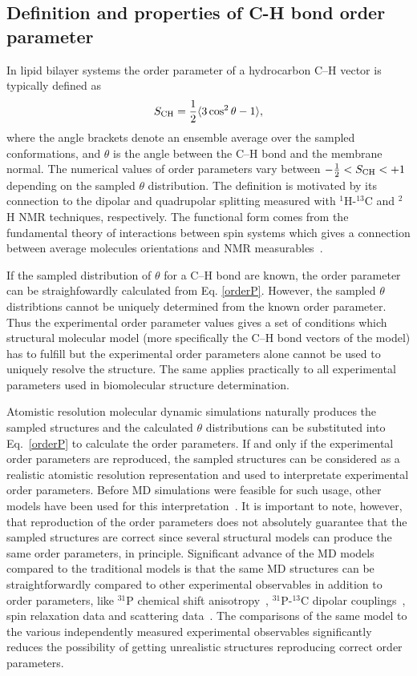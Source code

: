 \documentclass[aps,prl,superscriptaddress,twocolumn]{revtex4}
\begin{document}
\subsection{Definition and properties of C-H bond order parameter}\label{OPdefinition}
In lipid bilayer systems the order parameter of a hydrocarbon C--H vector is typically defined as 
\begin{equation}\label{orderP}
S_{{\rm CH}}=\frac{1}{2}\langle 3 \cos^2 \theta-1 \rangle,
\end{equation} 
where the angle brackets denote an ensemble average over the sampled conformations, and $\theta$ is the 
angle between the C--H bond and the membrane normal.
The numerical values of order parameters vary between $-\frac{1}{2} < S_{{\rm CH}} < +1$
depending on the sampled $\theta$ distribution.
The definition is motivated by its connection to the dipolar and quadrupolar splitting measured with
$^1$H-$^{13}$C and $^2$H NMR techniques, respectively. The functional form comes from 
the fundamental theory of interactions between spin systems which gives a connection between 
average molecules orientations and NMR measurables~\cite{abragam}. 

If the sampled distribution of $\theta$ for a C--H bond are known, the order parameter
can be straighfowardly calculated from Eq. \ref{orderP}. However, the sampled $\theta$ 
distribtions cannot be uniquely determined from the known order parameter. Thus the experimental
order parameter values gives a set of conditions which structural molecular model 
(more specifically the C--H bond vectors of the model) has to fulfill
but the experimental order parameters alone cannot be used to uniquely 
resolve the structure. The same applies practically to all
experimental parameters used in biomolecular structure determination. 

Atomistic resolution molecular dynamic simulations naturally produces the
sampled structures and the calculated $\theta$ distributions can be substituted
into Eq.~\ref{orderP} to calculate the order parameters.
If and only if the experimental order parameters are
reproduced, the sampled structures can be considered as a realistic
atomistic resolution representation and used to interpretate experimental order parameters.
Before MD simulations were feasible for such usage, other models have been used for 
this interpretation~\cite{seelig74,gally75,seelig77,seelig78,strenk85,baenziger91,hong95b,bruzik97}.
It is important to note, however, that reproduction of the order parameters does not absolutely 
guarantee that the sampled structures are correct since several structural models 
can produce the same order parameters, in principle. 
Significant advance of the MD models compared to the traditional models is that the same MD 
structures can be straightforwardly compared to other experimental observables in addition to order parameters, 
like $^{31}$P chemical shift anisotropy~\cite{chowdhary13}, $^{31}$P-$^{13}$C dipolar couplings~\cite{prakash10},
spin relaxation data \cite{ferreira15} and scattering data~\cite{kucerka10}. The comparisons
of the same model to the various independently measured experimental observables significantly reduces the 
possibility of getting unrealistic structures reproducing correct order parameters.
\end{document}
